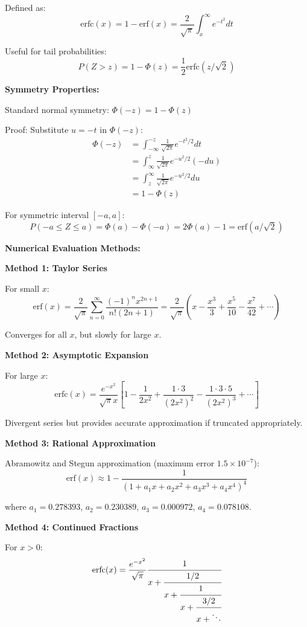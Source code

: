 \documentclass[12pt]{article}
\begin{document}
\begin{explanation}
Defined as:
\[
\text{erfc}(x) = 1 - \text{erf}(x) = \frac{2}{\sqrt{\pi}}\int_x^\infty e^{-t^2}dt
\]

Useful for tail probabilities:
\[
P(Z > z) = 1 - \Phi(z) = \frac{1}{2}\text{erfc}(z/\sqrt{2})
\]

\textbf{Symmetry Properties:}

Standard normal symmetry: $\Phi(-z) = 1 - \Phi(z)$

Proof: Substitute $u = -t$ in $\Phi(-z)$:
\begin{align*}
\Phi(-z) &= \int_{-\infty}^{-z} \frac{1}{\sqrt{2\pi}}e^{-t^2/2}dt \\
&= \int_{\infty}^z \frac{1}{\sqrt{2\pi}}e^{-u^2/2}(-du) \\
&= \int_z^\infty \frac{1}{\sqrt{2\pi}}e^{-u^2/2}du \\
&= 1 - \Phi(z)
\end{align*}

For symmetric interval $[-a, a]$:
\[
P(-a \leq Z \leq a) = \Phi(a) - \Phi(-a) = 2\Phi(a) - 1 = \text{erf}(a/\sqrt{2})
\]

\textbf{Numerical Evaluation Methods:}

\textbf{Method 1: Taylor Series}

For small $x$:
\[
\text{erf}(x) = \frac{2}{\sqrt{\pi}}\sum_{n=0}^\infty \frac{(-1)^n x^{2n+1}}{n!(2n+1)} = \frac{2}{\sqrt{\pi}}\left(x - \frac{x^3}{3} + \frac{x^5}{10} - \frac{x^7}{42} + \cdots\right)
\]

Converges for all $x$, but slowly for large $x$.

\textbf{Method 2: Asymptotic Expansion}

For large $x$:
\[
\text{erfc}(x) = \frac{e^{-x^2}}{\sqrt{\pi}x}\left[1 - \frac{1}{2x^2} + \frac{1 \cdot 3}{(2x^2)^2} - \frac{1 \cdot 3 \cdot 5}{(2x^2)^3} + \cdots\right]
\]

Divergent series but provides accurate approximation if truncated appropriately.

\textbf{Method 3: Rational Approximation}

Abramowitz and Stegun approximation (maximum error $1.5 \times 10^{-7}$):
\[
\text{erf}(x) \approx 1 - \frac{1}{(1 + a_1x + a_2x^2 + a_3x^3 + a_4x^4)^4}
\]

where $a_1 = 0.278393$, $a_2 = 0.230389$, $a_3 = 0.000972$, $a_4 = 0.078108$.

\textbf{Method 4: Continued Fractions}

For $x > 0$:
\[
\text{erfc}(x) = \frac{e^{-x^2}}{\sqrt{\pi}}\cfrac{1}{x + \cfrac{1/2}{x + \cfrac{1}{x + \cfrac{3/2}{x + \ddots}}}}
\]


\end{explanation}
\end{document}
